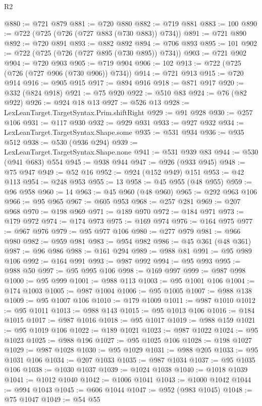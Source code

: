 \begin{lexlean}{R2}
\begin{coremodule}
@880 := @721 @879
@881 := @720 @880
@882 := @719 @881
@883 := 100
@890 := @722 (@725 (@726 (@727 @883 (@730 @883)) @734))
@891 := @721 @890
@892 := @720 @891
@893 := @882 @892
@894 := @706 @893
@895 := 101
@902 := @722 (@725 (@726 (@727 @895 (@730 @895)) @734))
@903 := @721 @902
@904 := @720 @903
@905 := @719 @904
@906 := 102
@913 := @722 (@725 (@726 (@727 @906 (@730 @906)) @734))
@914 := @721 @913
@915 := @720 @914
@916 := @905 @915
@917 := @894 @916
@918 := @871 @917
@920 := @332 (@824 @918)
@921 := @75 @920
@922 := @510 @83
@924 := @76 (@82 @922)
@926 := @924 @18 @13
@927 := @526 @13
@928 := LexLeanTarget.TargetSyntax.Prim.shiftRight
@929 := @91 @928
@930 := @257 @106
@931 := @117 @930
@932 := @929 @931
@933 := @927 @932
@934 := LexLeanTarget.TargetSyntax.Shape.some
@935 := @531 @934
@936 := @935 @512
@938 := @530 (@936 @294)
@939 := LexLeanTarget.TargetSyntax.Shape.none
@941 := @531 @939 @83
@944 := @530 (@941 @683) @554
@945 := @938 @944
@947 := @926 (@933 @945)
@948 := @75 @947
@949 := @52 @16
@952 := @924 (@152 @949) @151
@953 := @42 @113
@954 := @248 @953
@955 := 13
@958 := @45 @955 (@48 @955)
@959 := @96 @958
@960 := 14
@963 := @45 @960 (@48 @960)
@965 := @292 @963 @106
@966 := @95 @965
@967 := @605 @953
@968 := @257 @281
@969 := @207 @968
@970 := @198 @969
@971 := @189 @970
@972 := @184 @971
@973 := @179 @972
@974 := @174 @973
@975 := @169 @974
@976 := @164 @975
@977 := @967 @976
@979 := @95 @977 @106
@980 := @277 @979
@981 := @966 @980
@982 := @959 @981
@983 := @954 @982
@986 := @45 @361 (@48 @361)
@987 := @96 @986
@988 := @161 @294
@989 := @988 @81
@991 := @95 @989 @106
@992 := @164 @991
@993 := @987 @992
@994 := @95 @993
@995 := @988 @50
@997 := @95 @995 @106
@998 := @169 @997
@999 := @987 @998
@1000 := @95 @999
@1001 := @988 @113
@1003 := @95 @1001 @106
@1004 := @174 @1003
@1005 := @987 @1004
@1006 := @95 @1005
@1007 := @988 @138
@1009 := @95 @1007 @106
@1010 := @179 @1009
@1011 := @987 @1010
@1012 := @95 @1011
@1013 := @988 @143
@1015 := @95 @1013 @106
@1016 := @184 @1015
@1017 := @987 @1016
@1018 := @95 @1017
@1019 := @988 @159
@1021 := @95 @1019 @106
@1022 := @189 @1021
@1023 := @987 @1022
@1024 := @95 @1023
@1025 := @988 @196
@1027 := @95 @1025 @106
@1028 := @198 @1027
@1029 := @987 @1028
@1030 := @95 @1029
@1031 := @988 @205
@1033 := @95 @1031 @106
@1034 := @207 @1033
@1035 := @987 @1034
@1037 := @95 @1035 @106
@1038 := @1030 @1037
@1039 := @1024 @1038
@1040 := @1018 @1039
@1041 := @1012 @1040
@1042 := @1006 @1041
@1043 := @1000 @1042
@1044 := @994 @1043
@1045 := @606 @1044
@1047 := @952 (@983 @1045)
@1048 := @75 @1047
@1049 := @54 @55

\end{coremodule}
\end{lexlean}
